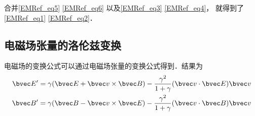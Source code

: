 合并\autoref{EMRef_eq5} \autoref{EMRef_eq6} 以及\autoref{EMRef_eq3} \autoref{EMRef_eq4}， 就得到了\autoref{EMRef_eq1} \autoref{EMRef_eq2}．


\subsection{电磁场张量的洛伦兹变换}

电磁场的变换公式可以通过电磁场张量的变换公式得到．结果为
\begin{equation}
\begin{aligned}
\bvec E'=\gamma(\bvec E+\bvec v\times \bvec B)-\frac{\gamma^2}{1+\gamma}(\bvec v \cdot \bvec E)\bvec v\\
\bvec B'=\gamma(\bvec B-\bvec v\times \bvec E)-\frac{\gamma^2}{1+\gamma}(\bvec v \cdot \bvec B)\bvec v
\end{aligned}
\end{equation}